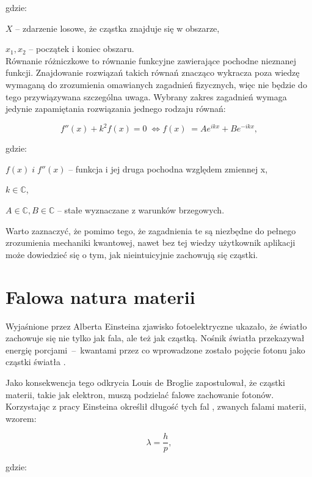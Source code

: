 \documentclass{SGGW-thesis}
\begin{document}
	gdzie:
	
	$X$ -- zdarzenie losowe, że cząstka znajduje się w obszarze,
	
	$x_1, x_2$ -- początek i koniec obszaru.\\ 	
	
	Równanie różniczkowe to równanie funkcyjne zawierające pochodne nieznanej funkcji. Znajdowanie rozwiązań takich równań znacząco wykracza poza wiedzę wymaganą do zrozumienia omawianych zagadnień fizycznych, więc nie będzie do tego przywiązywana szczególna uwaga. Wybrany zakres zagadnień wymaga jedynie zapamiętania rozwiązania jednego rodzaju równań:
	
	\begin{equation}
	f''(x)+k^2f(x)=0 \;\Longleftrightarrow f(x)\; = Ae^{ikx} + Be^{-ikx},
	\end{equation}

	gdzie:
	
	$f(x) \; i \; f''(x)$ -- funkcja i jej druga pochodna względem zmiennej x,

	$k \in \mathbb{C}$,
		
	$A \in \mathbb{C}, B \in \mathbb{C}$ -- stałe wyznaczane z warunków brzegowych.
	
	

	Warto zaznaczyć, że pomimo tego, że zagadnienia te są niezbędne do pełnego zrozumienia mechaniki kwantowej, nawet bez tej wiedzy użytkownik aplikacji może dowiedzieć się o tym, jak nieintuicyjnie zachowują się cząstki.
	\section{Falowa natura materii}
	Wyjaśnione przez Alberta Einsteina zjawisko fotoelektryczne ukazało, że światło zachowuje się nie tylko jak fala, ale też jak cząstką. Nośnik światła przekazywał energię porcjami~--~kwantami przez co wprowadzone zostało pojęcie fotonu jako cząstki światła \cite{fiz atom} \cite{mechanika kwant} \cite{fiz kwant} \cite{lewis}.
	
	 Jako konsekwencja tego odkrycia Louis de Broglie zapostulował, że cząstki materii, takie jak elektron, muszą podzielać falowe zachowanie fotonów. Korzystając z pracy Einsteina określił długość tych fal \cite{matter-wave}, zwanych falami materii, wzorem:
	 
	 \begin{equation}
	 \lambda=\frac{h}{p},
	 \end{equation}
	
	 
	 gdzie:
	 
\end{document}
